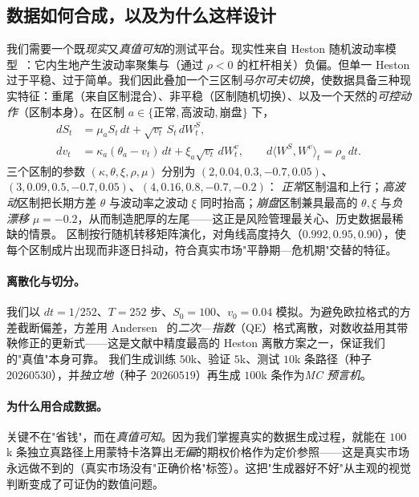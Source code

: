\documentclass[11pt]{ctexart}
\newcommand{\vt}{v_t}
\begin{document}
\subsection{数据如何合成，以及为什么这样设计}
\label{sec:data}
我们需要一个既\emph{现实}又\emph{真值可知}的测试平台。现实性来自 Heston 随机波动率模型~\citep{heston1993}：它内生地产生波动率聚集与（通过 $\rho<0$ 的杠杆相关）负偏。但单一 Heston 过于平稳、过于简单。我们因此叠加一个三区制\emph{马尔可夫切换}，使数据具备三种现实特征：重尾（来自区制混合）、非平稳（区制随机切换）、以及一个天然的\emph{可控动作}（区制本身）。在区制 $a\in\{\text{正常},\text{高波动},\text{崩盘}\}$ 下，
\begin{align}
dS_t &= \mu_a S_t\,dt + \sqrt{\vt}\,S_t\,dW^S_t, \\
d\vt &= \kappa_a(\theta_a-\vt)\,dt + \xi_a\sqrt{\vt}\,dW^v_t,
\qquad d\langle W^S,W^v\rangle_t = \rho_a\,dt .
\end{align}
三个区制的参数 $(\kappa,\theta,\xi,\rho,\mu)$ 分别为 $(2,0.04,0.3,-0.7,0.05)$、$(3,0.09,0.5,-0.7,0.05)$、$(4,0.16,0.8,-0.7,-0.2)$：
\emph{正常}区制温和上行；\emph{高波动}区制把长期方差 $\theta$ 与波动率之波动 $\xi$ 同时抬高；\emph{崩盘}区制兼具最高的 $\theta,\xi$ 与\emph{负漂移} $\mu=-0.2$，从而制造肥厚的左尾——这正是风险管理最关心、历史数据最稀缺的情景。
区制按行随机转移矩阵演化，对角线高度持久（$0.992,0.95,0.90$），使每个区制成片出现而非逐日抖动，符合真实市场"平静期—危机期"交替的特征。

\paragraph{离散化与切分。}我们以 $dt{=}1/252$、$T{=}252$ 步、$S_0{=}100$、$v_0{=}0.04$ 模拟。为避免欧拉格式的方差截断偏差，方差用 Andersen~\citep{andersen2008simple} 的\emph{二次—指数}（QE）格式离散，对数收益用其带鞅修正的更新式——这是文献中精度最高的 Heston 离散方案之一，保证我们的"真值"本身可靠。
我们生成训练 $50$k、验证 $5$k、测试 $10$k 条路径（种子 $20260530$），并\emph{独立地}（种子 $20260519$）再生成 $100$k 条作为\emph{MC 预言机}。

\paragraph{为什么用合成数据。}关键不在"省钱"，而在\emph{真值可知}。因为我们掌握真实的数据生成过程，就能在 $100$k 条独立真路径上用蒙特卡洛算出\emph{无偏}的期权价格作为定价参照——这是真实市场永远做不到的（真实市场没有"正确价格"标签）。这把"生成器好不好"从主观的视觉判断变成了可证伪的数值问题。
\end{document}
